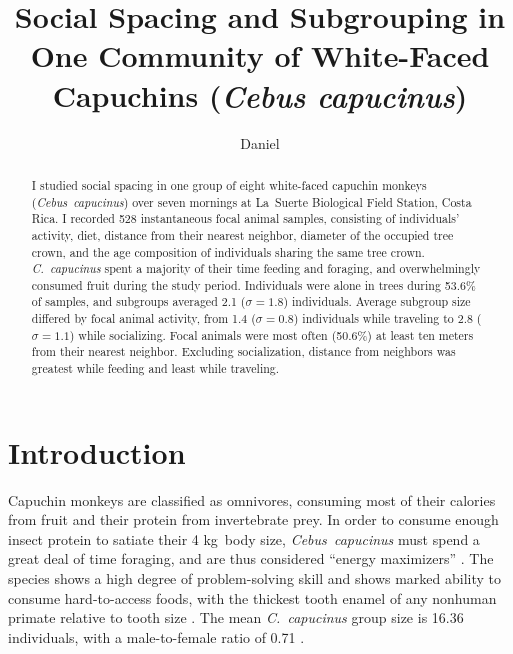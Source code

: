 \documentclass{../../../coursework}
\title{Social Spacing and Subgrouping in One Community of White-Faced Capuchins (\emph{Cebus capucinus})}
\subtitle{}
\author{Daniel}{Glenn}{Leonard}
\date{\displaydate{date}}
\begin{document}
\maketitle

\begin{abstract}
    I studied social spacing in one group of eight white-faced capuchin
    monkeys (\emph{Cebus~capucinus}) over seven mornings at La~Suerte
    Biological Field Station, Costa Rica. I recorded 528 instantaneous focal
    animal samples, consisting of individuals' activity, diet, distance from
    their nearest neighbor, diameter of the occupied tree crown, and the age
    composition of individuals sharing the same tree crown.
    \emph{C.~capucinus} spent a majority of their time feeding and foraging,
    and overwhelmingly consumed fruit during the study period. Individuals
    were alone in trees during 53.6\% of samples, and subgroups averaged 2.1
    (\(\sigma = 1.8\)) individuals. Average subgroup size differed by focal
    animal activity, from 1.4 (\(\sigma = 0.8\)) individuals while traveling
    to 2.8 (\(\sigma = 1.1\)) while socializing. Focal animals were most often
    (50.6\%) at least ten meters from their nearest neighbor. Excluding
    socialization, distance from neighbors was greatest while feeding and
    least while traveling.
\end{abstract}

\printkeywords

\section{Introduction}

Capuchin monkeys are classified as omnivores, consuming most of their calories
from fruit and their protein from invertebrate prey. In order to consume
enough insect protein to satiate their 4 kg~body size, \emph{Cebus~capucinus}
must spend a great deal of time foraging, and are thus considered ``energy
maximizers'' \parencite{Fragaszy2004}. The species shows a high degree of
problem-solving skill and shows marked ability to consume hard-to-access
foods, with the thickest tooth enamel of any nonhuman primate relative to
tooth size \parencite{Jack2011}. The mean \emph{C.~capucinus} group size is
16.36 individuals, with a male-to-female ratio of 0.71
\parencite{Fragaszy2004}.
\end{document}
